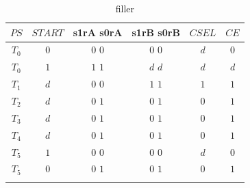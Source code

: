 \documentclass[11pt,a4paper,english]{article}
\begin{document}
\pagebreak
    \begin{table}[h!]
      \centering
      \caption{
          filler
          }
      
        \begin{tabular}{c|c|c|c|c|c}%
          \toprule%
          $ PS $             &        $START$            &        s1rA    s0rA           &        s1rB    s0rB      &          $CSEL$           &           $CE$                   \\
          \midrule%
              $T_0$            &          $0$              &          $0$       $0$        &        $0$      $0$      &          $d$            &           $0$                    \\ \hdashline%
              $T_0$            &          $1$              &          $1$       $1$        &        $d$      $d$      &          $d$            &           $d$                    \\ \hdashline%
              $T_1$            &          $d$              &          $0$       $0$        &        $1$      $1$      &          $1$            &           $1$                    \\ \hdashline%
              $T_2$            &          $d$              &          $0$       $1$        &        $0$      $1$      &          $0$            &           $1$                    \\ \hdashline%
              $T_3$            &          $d$              &          $0$       $1$        &        $0$      $1$      &          $0$            &           $1$                    \\ \hdashline%
              $T_4$            &          $d$              &          $0$       $1$        &        $0$      $1$      &          $0$            &           $1$                    \\ \hdashline%
              $T_5$            &          $1$              &          $0$       $0$        &        $0$      $0$      &          $d$            &           $0$                    \\ \hdashline%
              $T_5$            &          $0$              &          $0$       $1$        &        $0$      $1$      &          $0$            &           $1$                    \\ \hdashline%
        \end{tabular}
      \label{table:1}
    \end{table}
    
\end{document}
